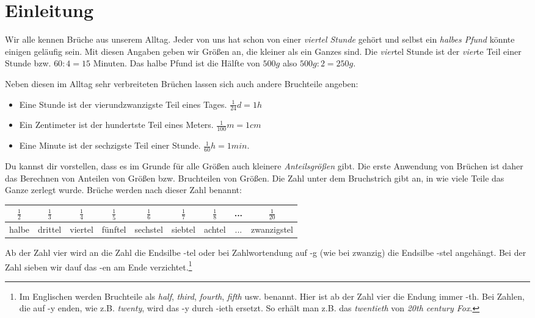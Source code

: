 	\section{Einleitung}\vspace{-1em}
Wir alle kennen Brüche aus unserem Alltag. Jeder von uns hat schon von einer \emph{viertel Stunde} gehört und selbst ein \emph{halbes Pfund} könnte einigen geläufig sein. Mit diesen Angaben geben wir Größen an, die kleiner als ein Ganzes sind. Die \emph{vier}tel Stunde ist der \emph{vier}te Teil einer Stunde bzw. $60:4 = 15$ Minuten. Das halbe Pfund ist die Hälfte von $500g$ also $500g:2=250g$.

Neben diesen im Alltag sehr verbreiteten Brüchen lassen sich auch andere Bruchteile angeben:
\begin{itemize}[noitemsep]
	\item Eine Stunde ist der vierundzwanzigste Teil eines Tages. \hfill $\frac{1}{24}d=1h$
	\item Ein Zentimeter ist der hundertste Teil eines Meters. \hfill$\frac{1}{100}m=1cm$
	\item Eine Minute ist der sechzigste Teil einer Stunde. \hfill $\frac{1}{60}h=1min.$
\end{itemize}
Du kannst dir vorstellen, dass es im Grunde für alle Größen auch kleinere \emph{Anteilsgrößen} gibt. Die erste Anwendung von Brüchen ist daher das Berechnen von Anteilen von Größen bzw. Bruchteilen von Größen. Die Zahl unter dem Bruchstrich gibt an, in wie viele Teile das Ganze zerlegt wurde. Brüche werden nach dieser Zahl benannt:
\begin{center}
	\begin{tabular}{c|c|c|c|c|c|c|c|c}
 $\frac{1}{2}$ & $\frac{1}{3}$ & $\frac{1}{4}$ & $\frac{1}{5}$ & $\frac{1}{6}$ & $\frac{1}{7}$ & $\frac{1}{8}$ & ... & $\frac{1}{20}$ \\ \hline
     halbe     &    drittel    &    viertel    &    fünftel    &   sechstel    &    siebtel    &    achtel     & ... &  zwanzigstel
	\end{tabular}
\end{center}
Ab der Zahl vier wird an die Zahl die Endsilbe \glqq{}-tel\grqq{} oder bei Zahlwortendung auf \glqq{}-g\grqq{} (wie bei zwanzig) die Endsilbe \glqq{}-stel\grqq{} angehängt. Bei der Zahl sieben wir dauf das \glqq{}-en\grqq{} am Ende verzichtet.\footnote{Im Englischen werden Bruchteile als \emph{half}, \emph{third}, \emph{fourth}, \emph{fifth} usw. benannt. Hier ist ab der Zahl vier die Endung immer \glqq-th\grqq{}. Bei Zahlen, die auf \glqq{}-y\grqq{} enden, wie z.B. \emph{twenty}, wird das \glqq{}-y\grqq{} durch \glqq{}-ieth\grqq{} ersetzt. So erhält man z.B. das \emph{twentieth} von \emph{20th century Fox}.}